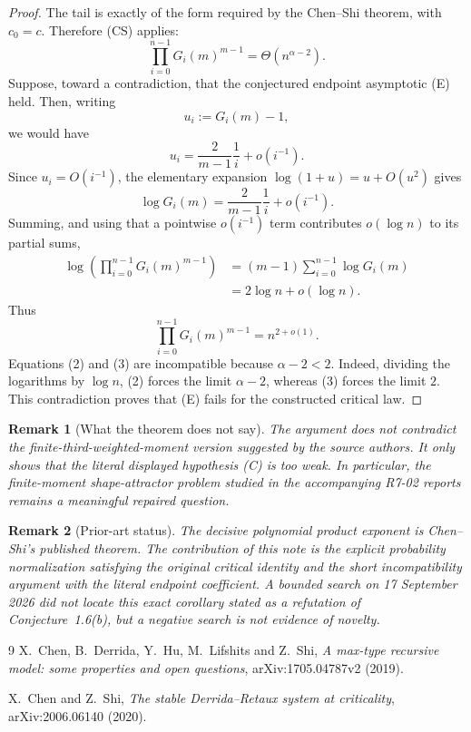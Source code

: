 \documentclass[11pt]{article}
\newtheorem{remark}{Remark}
\begin{document}
\begin{proof}
The tail is exactly of the form required by the Chen--Shi theorem, with $c_0=c$.  Therefore (CS) applies:
\begin{equation}
\prod_{i=0}^{n-1}G_i(m)^{m-1}=\Theta(n^{\alpha-2}).
\tag{2}
\end{equation}
Suppose, toward a contradiction, that the conjectured endpoint asymptotic (E) held.  Then, writing
\[
u_i:=G_i(m)-1,
\]
we would have
\[
u_i=\frac{2}{m-1}\frac1i+o(i^{-1}).
\]
Since $u_i=O(i^{-1})$, the elementary expansion $\log(1+u)=u+O(u^2)$ gives
\[
\log G_i(m)=\frac{2}{m-1}\frac1i+o(i^{-1}).
\]
Summing, and using that a pointwise $o(i^{-1})$ term contributes $o(\log n)$ to its partial sums,
\begin{align*}
\log\left(\prod_{i=0}^{n-1}G_i(m)^{m-1}\right)
&=(m-1)\sum_{i=0}^{n-1}\log G_i(m)\\
&=2\log n+o(\log n).
\end{align*}
Thus
\begin{equation}
\prod_{i=0}^{n-1}G_i(m)^{m-1}=n^{2+o(1)}.
\tag{3}
\end{equation}
Equations (2) and (3) are incompatible because $\alpha-2<2$.  Indeed, dividing the logarithms by $\log n$, (2) forces the limit $\alpha-2$, whereas (3) forces the limit $2$.  This contradiction proves that (E) fails for the constructed critical law.
\end{proof}

\begin{remark}[What the theorem does not say]
The argument does not contradict the finite-third-weighted-moment version suggested by the source authors.  It only shows that the literal displayed hypothesis (C) is too weak.  In particular, the finite-moment shape-attractor problem studied in the accompanying R7-02 reports remains a meaningful repaired question.
\end{remark}

\begin{remark}[Prior-art status]
The decisive polynomial product exponent is Chen--Shi's published theorem.  The contribution of this note is the explicit probability normalization satisfying the original critical identity and the short incompatibility argument with the literal endpoint coefficient.  A bounded search on 17 September 2026 did not locate this exact corollary stated as a refutation of Conjecture~1.6(b), but a negative search is not evidence of novelty.
\end{remark}

\begin{thebibliography}{9}
X.~Chen, B.~Derrida, Y.~Hu, M.~Lifshits and Z.~Shi,
\emph{A max-type recursive model: some properties and open questions},
arXiv:1705.04787v2 (2019).

X.~Chen and Z.~Shi,
\emph{The stable Derrida--Retaux system at criticality},
arXiv:2006.06140 (2020).
\end{thebibliography}
\end{document}
